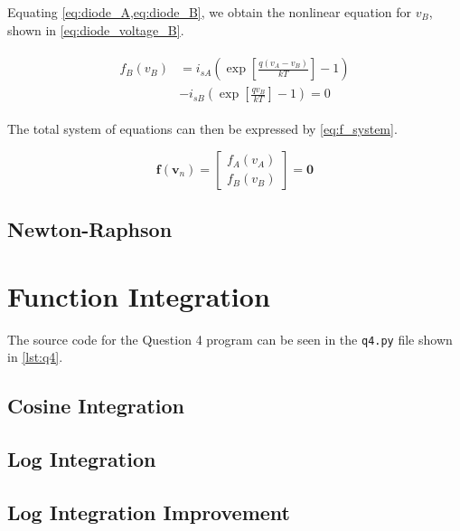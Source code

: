 \documentclass[a4paper,titlepage]{article}
\begin{document}
	Equating \cref{eq:diode_A,eq:diode_B}, we obtain the nonlinear equation for $v_B$, shown in \cref{eq:diode_voltage_B}.
	
	\begin{align} \label{eq:diode_voltage_B}
	\begin{split}
		f_B(v_B) &= i_{sA} \left( \exp\left[{\frac{q(v_A - v_B)}{kT}}\right] - 1\right)\\
		&- i_{sB} \left( \exp\left[{\frac{qv_B}{kT}}\right] - 1\right) = 0
	\end{split}
	\end{align}
	
	The total system of equations can then be expressed by \cref{eq:f_system}.
	
	\begin{equation} \label{eq:f_system}
		\textbf{f}(\textbf{v}_n) = 
		\begin{bmatrix}
		f_A(v_A) \\
		f_B(v_B)
		\end{bmatrix}
		= \textbf{0}
	\end{equation}
	
	
	\subsection{Newton-Raphson}
	
	
	\section{Function Integration}
	The source code for the Question 4 program can be seen in the \texttt{q4.py} file shown in \cref{lst:q4}.
	
	\subsection{Cosine Integration}
	
	\subsection{Log Integration}
	
	\subsection{Log Integration Improvement}
	
\end{document}
